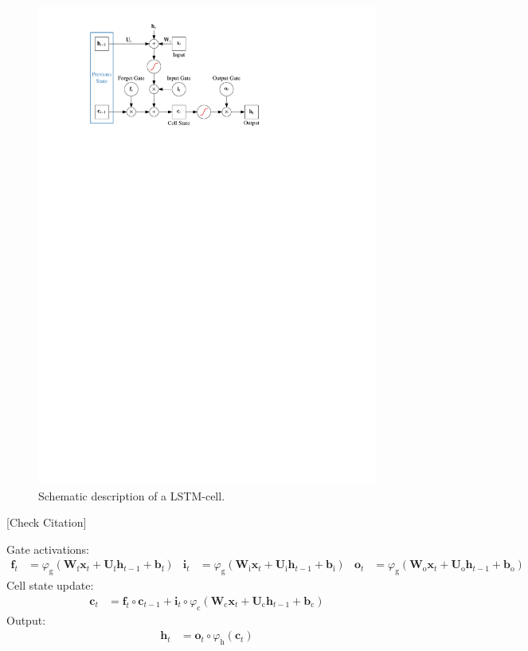 \begin{figure}[t]
  \centering
  \includegraphics{./figures/theory/LSTM.pdf}
  \caption{Schematic description of a LSTM-cell.}
  \label{fig:schematic_lstm}
\end{figure}

[Check Citation]\cite{lstm}

Gate activations:
\begin{align*}
  \mathbf{f}_{t} &= \varphi_{\text{g}}\left( \mathbf{W}_{\text{f}} \mathbf{x}_{t} + \mathbf{U}_{\text{f}} \mathbf{h}_{t-1} + \mathbf{b}_{\text{f}} \right) &
  \mathbf{i}_{t} &= \varphi_{\text{g}}\left( \mathbf{W}_{\text{i}} \mathbf{x}_{t} + \mathbf{U}_{\text{i}} \mathbf{h}_{t-1} + \mathbf{b}_{\text{i}} \right) &
  \mathbf{o}_{t} &= \varphi_{\text{g}}\left( \mathbf{W}_{\text{o}} \mathbf{x}_{t} + \mathbf{U}_{\text{o}} \mathbf{h}_{t-1} + \mathbf{b}_{\text{o}} \right)
\end{align*}
Cell state update:
\begin{align*}
  \mathbf{c}_{t} &= \mathbf{f}_{t} \circ \mathbf{c}_{t-1}
                   + \mathbf{i}_{t} \circ \varphi_{\text{c}}(
                   \mathbf{W}_{\text{c}} \mathbf{x}_{t}+ \mathbf{U}_{\text{c}}
                   \mathbf{h}_{t-1} + \mathbf{b}_{\text{c}})
\end{align*}
Output:
\begin{align*}
  \mathbf{h}_{t} &= \mathbf{o}_{t} \circ \varphi_{\text{h}}(\mathbf{c}_{t})
\end{align*}

